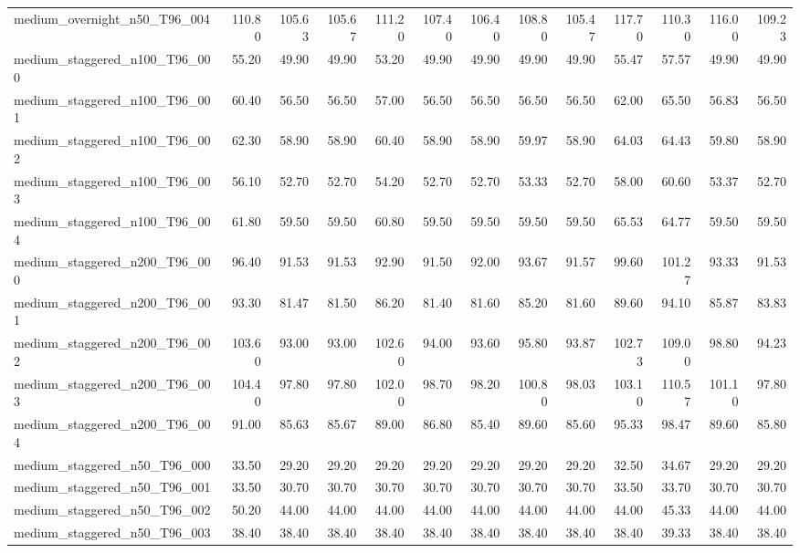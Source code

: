 \begin{table}[htbp]
\begin{tabular}{lrrrrrrrrrrrr}
medium\_overnight\_n50\_T96\_004 & 110.80 & 105.63 & 105.67 & 111.20 & 107.40 & 106.40 & 108.80 & 105.47 & 117.70 & 110.30 & 116.00 & 109.23 \\
medium\_staggered\_n100\_T96\_000 & 55.20 & 49.90 & 49.90 & 53.20 & 49.90 & 49.90 & 49.90 & 49.90 & 55.47 & 57.57 & 49.90 & 49.90 \\
medium\_staggered\_n100\_T96\_001 & 60.40 & 56.50 & 56.50 & 57.00 & 56.50 & 56.50 & 56.50 & 56.50 & 62.00 & 65.50 & 56.83 & 56.50 \\
medium\_staggered\_n100\_T96\_002 & 62.30 & 58.90 & 58.90 & 60.40 & 58.90 & 58.90 & 59.97 & 58.90 & 64.03 & 64.43 & 59.80 & 58.90 \\
medium\_staggered\_n100\_T96\_003 & 56.10 & 52.70 & 52.70 & 54.20 & 52.70 & 52.70 & 53.33 & 52.70 & 58.00 & 60.60 & 53.37 & 52.70 \\
medium\_staggered\_n100\_T96\_004 & 61.80 & 59.50 & 59.50 & 60.80 & 59.50 & 59.50 & 59.50 & 59.50 & 65.53 & 64.77 & 59.50 & 59.50 \\
medium\_staggered\_n200\_T96\_000 & 96.40 & 91.53 & 91.53 & 92.90 & 91.50 & 92.00 & 93.67 & 91.57 & 99.60 & 101.27 & 93.33 & 91.53 \\
medium\_staggered\_n200\_T96\_001 & 93.30 & 81.47 & 81.50 & 86.20 & 81.40 & 81.60 & 85.20 & 81.60 & 89.60 & 94.10 & 85.87 & 83.83 \\
medium\_staggered\_n200\_T96\_002 & 103.60 & 93.00 & 93.00 & 102.60 & 94.00 & 93.60 & 95.80 & 93.87 & 102.73 & 109.00 & 98.80 & 94.23 \\
medium\_staggered\_n200\_T96\_003 & 104.40 & 97.80 & 97.80 & 102.00 & 98.70 & 98.20 & 100.80 & 98.03 & 103.10 & 110.57 & 101.10 & 97.80 \\
medium\_staggered\_n200\_T96\_004 & 91.00 & 85.63 & 85.67 & 89.00 & 86.80 & 85.40 & 89.60 & 85.60 & 95.33 & 98.47 & 89.60 & 85.80 \\
medium\_staggered\_n50\_T96\_000 & 33.50 & 29.20 & 29.20 & 29.20 & 29.20 & 29.20 & 29.20 & 29.20 & 32.50 & 34.67 & 29.20 & 29.20 \\
medium\_staggered\_n50\_T96\_001 & 33.50 & 30.70 & 30.70 & 30.70 & 30.70 & 30.70 & 30.70 & 30.70 & 33.50 & 33.70 & 30.70 & 30.70 \\
medium\_staggered\_n50\_T96\_002 & 50.20 & 44.00 & 44.00 & 44.00 & 44.00 & 44.00 & 44.00 & 44.00 & 44.00 & 45.33 & 44.00 & 44.00 \\
medium\_staggered\_n50\_T96\_003 & 38.40 & 38.40 & 38.40 & 38.40 & 38.40 & 38.40 & 38.40 & 38.40 & 38.40 & 39.33 & 38.40 & 38.40 \\

\end{tabular}
\end{table}
